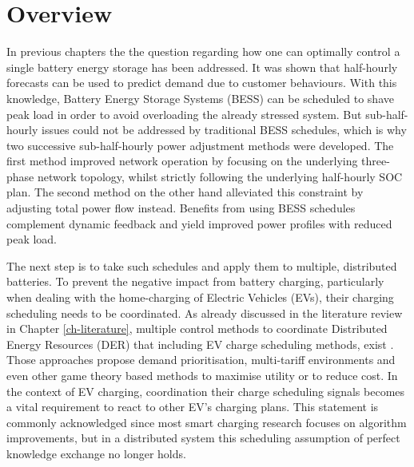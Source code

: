 \section{Overview}
\label{ch3:sec:overview}

In previous chapters the the question regarding how one can optimally control a single battery energy storage has been addressed.
It was shown that half-hourly forecasts can be used to predict demand due to customer behaviours.
With this knowledge, Battery Energy Storage Systems (BESS) can be scheduled to shave peak load in order to avoid overloading the already stressed system.
But sub-half-hourly issues could not be addressed by traditional BESS schedules, which is why two successive sub-half-hourly power adjustment methods were developed.
The first method improved network operation by focusing on the underlying three-phase network topology, whilst strictly following the underlying half-hourly SOC plan.
The second method on the other hand alleviated this constraint by adjusting total power flow instead.
Benefits from using BESS schedules complement dynamic feedback and yield improved power profiles with reduced peak load.

The next step is to take such schedules and apply them to multiple, distributed batteries.
To prevent the negative impact from battery charging, particularly when dealing with the home-charging of Electric Vehicles (EVs), their charging scheduling needs to be coordinated.
As already discussed in the literature review in Chapter \ref{ch-literature}, multiple control methods to coordinate Distributed Energy Resources (DER) that including EV charge scheduling methods, exist \cite{Atia2016, Bidram2012, Bidram2014, Dolan2012, Gill2014, Guerrero2008, Guerrero2013, Sugihara2013, Toledo2013, Wang2016, Vovos2007, Guerrero2013a, Mansouri-Samani1993, Marra2013, Mokhtari2013}. 
Those approaches propose demand prioritisation, multi-tariff environments and even other game theory based methods to maximise utility or to reduce cost.
In the context of EV charging, coordination their charge scheduling signals becomes a vital requirement to react to other EV's charging plans.
This statement is commonly acknowledged since most smart charging research focuses on algorithm improvements, but in a distributed system this scheduling assumption of perfect knowledge exchange no longer holds.


